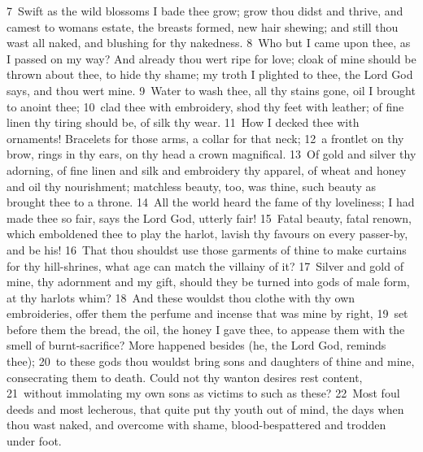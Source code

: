 \documentclass[10pt]{book} %
\begin{document}
\textcolor{benred8}{7}~Swift as the wild blossoms I bade thee grow; grow thou didst and thrive, and camest to woman\textquotesingle s estate, the breasts formed, new hair shewing; and still thou wast all naked, and blushing for thy nakedness. \textcolor{benred8}{8}~Who but I came upon thee, as I passed on my way? And already thou wert ripe for love; cloak of mine should be thrown about thee, to hide thy shame; my troth I plighted to thee, the Lord God says, and thou wert mine. \textcolor{benred8}{9}~Water to wash thee, all thy stains gone, oil I brought to anoint thee; \textcolor{benred8}{10}~clad thee with embroidery, shod thy feet with leather; of fine linen thy tiring should be, of silk thy wear. \textcolor{benred8}{11}~How I decked thee with ornaments! Bracelets for those arms, a collar for that neck; \textcolor{benred8}{12}~a frontlet on thy brow, rings in thy ears, on thy head a crown magnifical. \textcolor{benred8}{13}~Of gold and silver thy adorning, of fine linen and silk and embroidery thy apparel, of wheat and honey and oil thy nourishment; matchless beauty, too, was thine, such beauty as brought thee to a throne. \textcolor{benred8}{14}~All the world heard the fame of thy loveliness; I had made thee so fair, says the Lord God, utterly fair!
\textcolor{benred8}{15}~Fatal beauty, fatal renown, which emboldened thee to play the harlot, lavish thy favours on every passer-by, and be his! \textcolor{benred8}{16}~That thou shouldst use those garments of thine to make curtains for thy hill-shrines, what age can match the villainy of it? \textcolor{benred8}{17}~Silver and gold of mine, thy adornment and my gift, should they be turned into gods of male form, at thy harlot\textquotesingle s whim? \textcolor{benred8}{18}~And these wouldst thou clothe with thy own embroideries, offer them the perfume and incense that was mine by right, \textcolor{benred8}{19}~set before them the bread, the oil, the honey I gave thee, to appease them with the smell of burnt-sacrifice? More happened besides (he, the Lord God, reminds thee); \textcolor{benred8}{20}~to these gods thou wouldst bring sons and daughters of thine and mine, consecrating them to death. Could not thy wanton desires rest content, \textcolor{benred8}{21}~without immolating my own sons as victims to such as these? \textcolor{benred8}{22}~Most foul deeds and most lecherous, that quite put thy youth out of mind, the days when thou wast naked, and overcome with shame, blood-bespattered and trodden under foot.
\end{document}
